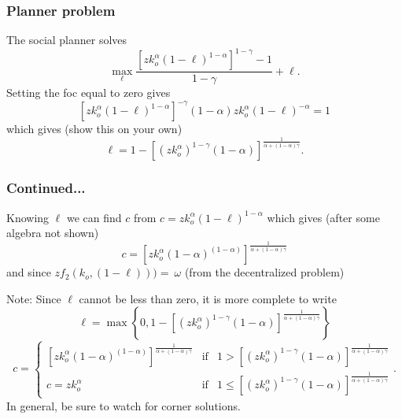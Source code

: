 \documentclass[aspectratio=169]{ltx-talk}
\begin{document}
\begin{frame}
\frametitle{Planner problem}
The social planner solves%
\begin{equation*}
\underset{\ell }{\max }\frac{\left[ zk_{o}^{\alpha }\left( 1-\ell \right)
^{1-\alpha }\right] ^{1-\gamma }-1}{1-\gamma }+\ell .
\end{equation*}%
Setting the foc equal to zero gives%
\begin{equation*}
\left[ zk_{o}^{\alpha }\left( 1-\ell \right) ^{1-\alpha }\right] ^{-\gamma
}\left( 1-\alpha \right) zk_{o}^{\alpha }\left( 1-\ell \right) ^{-\alpha }=1
\end{equation*}%
which gives (show this on your own)%
\begin{equation*}
\ell =1-\left[ \left( zk_{o}^{\alpha }\right) ^{1-\gamma }\left( 1-\alpha
\right) \right] ^{\frac{1}{\alpha +\left( 1-\alpha \right) \gamma }}.
\end{equation*}%
\end{frame}

\begin{frame}
\frametitle{Continued...}
Knowing $\ell $ we can find $c$ from $c=zk_{o}^{\alpha }\left(
1-\ell \right) ^{1-\alpha }$ which gives (after some algebra not shown)%
\begin{equation*}
c=\left[ zk_{o}^{\alpha }\left( 1-\alpha \right) ^{\left( 1-\alpha \right) }%
\right] ^{\frac{1}{\alpha +\left( 1-\alpha \right) \gamma }}
\end{equation*}%
and since $zf_{2}\left( k_{o},\left( 1-\ell \right) \right) )=\ \omega $
(from the decentralized problem) $\allowbreak $

Note: Since $\ell $ cannot be less than zero, it is more complete to write 
\begin{equation*}
\ell =\max \left\{ 0,1-\left[ \left( zk_{o}^{\alpha }\right) ^{1-\gamma
}\left( 1-\alpha \right) \right] ^{\frac{1}{\alpha +\left( 1-\alpha \right)
\gamma }}\right\}
\end{equation*}%
\begin{equation*}
c=\left\{ 
\begin{array}{ccc}
\left[ zk_{o}^{\alpha }\left( 1-\alpha \right) ^{\left( 1-\alpha \right) }%
\right] ^{\frac{1}{\alpha +\left( 1-\alpha \right) \gamma }} & \text{if} & 
1> \left[ \left( zk_{o}^{\alpha }\right) ^{1-\gamma }\left( 1-\alpha \right) %
\right] ^{\frac{1}{\alpha +\left( 1-\alpha \right) \gamma }} \\ 
c=zk_{o}^{\alpha } & \text{if} & 1\leq \left[ \left( zk_{o}^{\alpha }\right)
^{1-\gamma }\left( 1-\alpha \right) \right] ^{\frac{1}{\alpha +\left(
1-\alpha \right) \gamma }}%
\end{array}%
\right. .
\end{equation*}%
In general, be sure to watch for corner solutions.
\end{frame}
\end{document}
